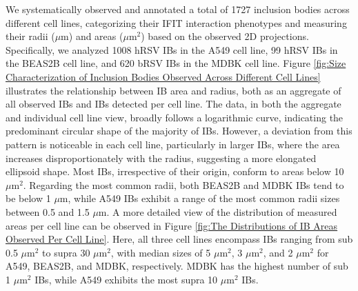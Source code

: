 We systematically observed and annotated a total of 1727 inclusion bodies across different cell lines, categorizing their IFIT interaction phenotypes and measuring their radii (\(\mu \mbox{m}\)) and areas (\(\mu \mbox{m}^2\)) based on the observed 2D projections. Specifically, we analyzed 1008 hRSV IBs in the A549 cell line, 99 hRSV IBs in the BEAS2B cell line, and 620 bRSV IBs in the MDBK cell line. Figure \ref{fig:Size Characterization of Inclusion Bodies Observed Across Different Cell Lines} illustrates the relationship between IB area and radius, both as an aggregate of all observed IBs and IBs detected per cell line. The data, in both the aggregate and individual cell line view, broadly follows a logarithmic curve, indicating the predominant circular shape of the majority of IBs. However, a deviation from this pattern is noticeable in each cell line, particularly in larger IBs, where the area increases disproportionately with the radius, suggesting a more elongated ellipsoid shape. Most IBs, irrespective of their origin, conform to areas below 10 \(\mu \mbox{m}^2\). Regarding the most common radii, both BEAS2B and MDBK IBs tend to be below 1 \(\mu \mbox{m}\), while A549 IBs exhibit a range of the most common radii sizes between 0.5 and 1.5 \(\mu \mbox{m}\). A more detailed view of the distribution of measured areas per cell line can be observed in Figure \ref{fig:The Distributions of IB Areas Observed Per Cell Line}. Here, all three cell lines encompass IBs ranging from sub 0.5 \(\mu \mbox{m}^2\) to supra 30 \(\mu \mbox{m}^2\), with median sizes of 5 \(\mu \mbox{m}^2\), 3 \(\mu \mbox{m}^2\), and 2 \(\mu \mbox{m}^2\) for A549, BEAS2B, and MDBK, respectively. MDBK has the highest number of sub 1 \(\mu \mbox{m}^2\) IBs, while A549 exhibits the most supra 10 \(\mu \mbox{m}^2\) IBs.


